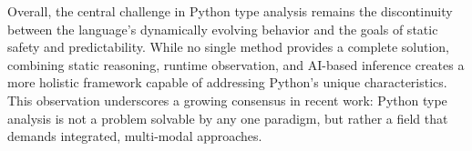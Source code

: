 Overall, the central challenge in Python type analysis remains the
discontinuity between the language’s dynamically evolving behavior and the
goals of static safety and predictability.
While no single method provides a complete solution, combining static
reasoning, runtime observation, and AI-based inference creates a more holistic
framework capable of addressing Python’s unique characteristics.
This observation underscores a growing consensus in recent work: Python type
analysis is not a problem solvable by any one paradigm, but rather a field that
demands integrated, multi-modal approaches.
